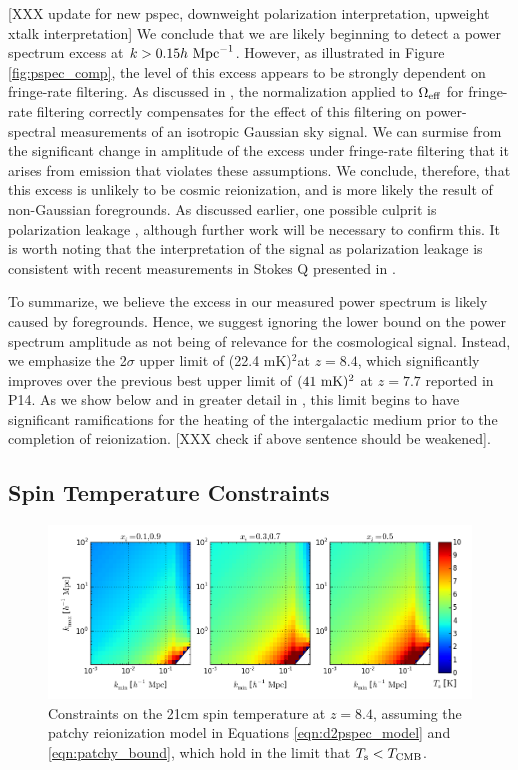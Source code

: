 \documentclass[twocolumn,numberedappendix]{emulateapj} \shorttitle{PSA64}
\newcommand{\hMpci}{h\ {\rm Mpc}^{-1}}
\newcommand{\mKlimit}{(22.4 mK)$^2$}
\begin{document}
[XXX update for new pspec, downweight polarization interpretation, upweight xtalk interpretation]
We conclude that we are likely beginning to 
detect a power spectrum excess at $k>0.15\hMpci$.  However, as illustrated
in Figure \ref{fig:pspec_comp}, the level of this excess appears to be
strongly dependent on fringe-rate filtering.  As discussed in \citet{parsons_et_al2015},
the normalization applied to $\Omega_{\rm eff}$ for fringe-rate filtering correctly
compensates for the effect of this filtering on power-spectral measurements
of an isotropic Gaussian sky signal.  We can surmise from the significant change in amplitude of the excess
under fringe-rate filtering that it arises from emission that violates these assumptions.
We conclude, therefore, that this excess is unlikely to be cosmic reionization, and is more
likely the result of non-Gaussian foregrounds.  As discussed earlier, one possible
culprit is polarization leakage \citep{moore_et_al2013,jelic_et_al2010,jelic_et_al2014}, although further
work will be necessary to confirm this.  It is worth noting that the interpretation of
the signal as polarization leakage is consistent with recent measurements in Stokes Q presented
in \citet{moore_et_al2015}.


To summarize, we believe the excess in our measured power spectrum is likely caused
by foregrounds.  Hence, we suggest ignoring the lower bound on the power spectrum amplitude
as not being of relevance for the cosmological signal.  Instead, we emphasize the 
2$\sigma$ upper limit of \mKlimit at $z=8.4$, which significantly improves over the previous
best upper limit of $(41~{\rm mK})^2$ at $z=7.7$ reported in P14.  As we show below and in
greater detail in \citet{pober_et_al2015}, this limit begins to have significant ramifications
for the heating of the intergalactic medium prior to the completion of reionization.
[XXX check if above sentence should be weakened].

\subsection{Spin Temperature Constraints}

\begin{figure}\centering
\includegraphics[width=2\columnwidth]{plots/ts_patchy_bound.png}
\caption{Constraints on the 21cm spin temperature at $z=8.4$, 
assuming 
the patchy reionization model in Equations
\eqref{eqn:d2pspec_model} and \eqref{eqn:patchy_bound}, which hold in the limit
that $T_{\rm s}<T_{\rm CMB}$.
} \label{fig:patchy_bound}
\end{figure}
\end{document}

